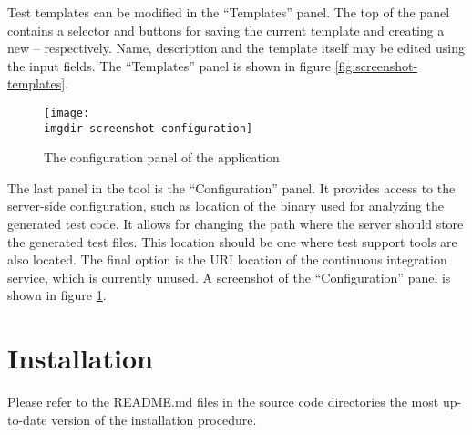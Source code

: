 \noindent Test templates can be modified in the ``Templates'' panel. The top of the panel contains a selector and buttons for saving the current template and creating a new -- respectively. Name, description and the template itself may be edited using the input fields. The ``Templates'' panel is shown in figure \ref{fig:screenshot-templates}.\medskip

\begin{figure}[!htbp]
  \centering
  \texttt{[image: \\imgdir screenshot-configuration]}
  \caption{The configuration panel of the application}
\label{fig:screenshot-configuration}
\end{figure}

\noindent The last panel in the tool is the ``Configuration'' panel. It provides access to the server-side configuration, such as location of the binary used for analyzing the generated test code. It allows for changing the path where the server should store the generated test files. This location should be one where test support tools are also located. The final option is the URI location of the continuous integration service, which is currently unused. A screenshot of the ``Configuration'' panel is shown in figure \ref{fig:screenshot-configuration}.

\section{Installation}
Please refer to the README.md files in the source code directories the most up-to-date version of the installation procedure.
